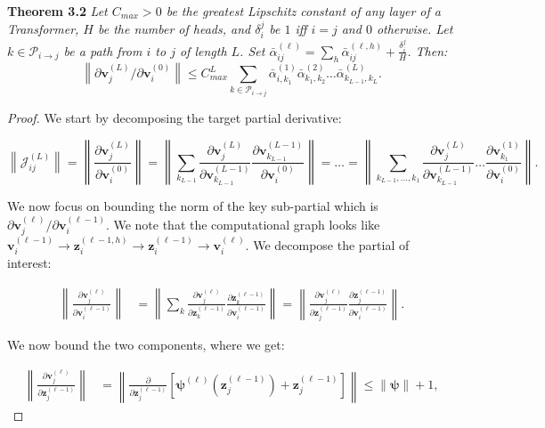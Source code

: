 \documentclass{article} %
\newcommand{\vb}{\mathbf{v}}
\newcommand{\zb}{\mathbf{z}}
\newcommand{\psib}{\boldsymbol{\psi}}
\newcommand{\J}{\mathcal{J}}
\begin{document}
\textbf{Theorem 3.2}\textit{ Let $C_{max} > 0$ be the greatest Lipschitz constant of any layer of a Transformer, $H$ be the number of heads, and $\delta_i^j$ be $1$ iff $i=j$ and $0$ otherwise. Let $k \in \mathcal{P}_{i \to j}$ be a path from $i$ to $j$ of length $L$. Set $\bar{\alpha}_{ij}^{(\ell)} = \sum_{h} \bar{\alpha}_{ij}^{(\ell, h)} + \frac{\delta_i^j}{H}$. Then: 
\begin{equation}
    \left \lVert \partial \vb^{(L)}_j / \partial \vb^{(0)}_i \right \rVert \leq C^L_{max} \sum_{k \in \mathcal{P}_{i \to j}}  \bar{\alpha}^{(1)}_{i, k_1} \bar{\alpha}^{(2)}_{k_1, k_2} \dots \bar{\alpha}^{(L)}_{k_{L-1}, k_{L}}.
\end{equation}    
}
\begin{proof}
We start by decomposing the target partial derivative:

\begin{equation*}
    \left \lVert \J_{ij}^{(L)} \right \rVert = \left \lVert \frac{\partial \vb^{(L)}_j}{\partial \vb^{(0)}_i}\right \rVert = \left \lVert \sum_{k_{L-1}} \frac{\partial \vb^{(L)}_j}{\partial \vb^{(L-1)}_{k_{L-1}}} \frac{\partial \vb^{(L-1)}_{k_{L-1}}}{\partial \vb^{(0)}_{i}} \right \rVert = \dots = \left \lVert \sum_{k_{L-1}, \dots, k_1} \frac{\partial \vb^{(L)}_j}{\partial \vb^{(L-1)}_{k_{L-1}}} \dots \frac{\partial \vb^{(1)}_{k_{1}}}{\partial \vb^{(0)}_{i}} \right \rVert.
\end{equation*}

We now focus on bounding the norm of the key sub-partial which is $\partial \vb_j^{(\ell)} / \partial \vb_i^{(\ell -1)}$. We note that the computational graph looks like $\vb_i^{(\ell -1)} \to \zb_i^{(\ell -1, h)} \to \zb_i^{(\ell -1)} \to \vb_i^{(\ell)}$. We decompose the partial of interest:

\begin{align*}
    \left \lVert \frac{\partial \vb_j^{(\ell)}}{\partial \vb_i^{(\ell -1)}} \right \rVert &= \left \lVert \sum_k \frac{\partial \vb_j^{(\ell)}}{\partial \zb_k^{(\ell - 1)}} \frac{\partial \zb_k^{(\ell - 1)}}{\partial \vb_i^{(\ell- 1)}} \right \rVert = \left \lVert \frac{\partial \vb_j^{(\ell)}}{\partial \zb_j^{(\ell - 1)}} \frac{\partial \zb_j^{(\ell - 1)}}{\partial \vb_i^{(\ell- 1)}} \right \rVert. 
\end{align*}

We now bound the two components, where we get:

\begin{align*}
 \left \lVert \frac{\partial \vb_j^{(\ell)}}{\partial \zb_j^{(\ell - 1)}} \right \rVert &= \left \lVert \frac{\partial }{\partial \zb_j^{(\ell - 1)}} \left[\psib^{(\ell)}\left(\zb_j^{(\ell - 1)}\right) + \zb_j^{(\ell - 1)}\right] \right \rVert \leq \left \lVert \psib \right \rVert + 1, 
\end{align*}


\end{proof}
\end{document}
